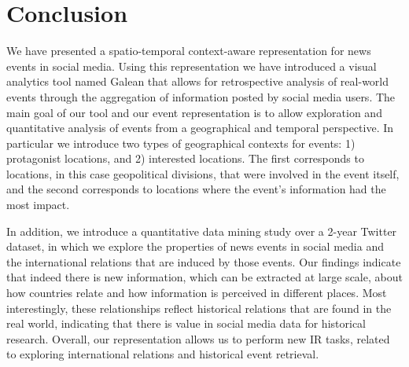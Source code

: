 
\section{Conclusion} \label{sec:conclusions}


We have presented a spatio-temporal context-aware representation for news events
in social media. 
%
Using this representation we have introduced a visual analytics tool named
Galean that allows for retrospective analysis of real-world events through the
aggregation of information posted by social media users. 
%
The main goal of our tool and our event representation is to allow exploration
and quantitative analysis of events from a geographical and temporal
perspective. 
%
In particular we introduce two types of geographical contexts for events: 1)
protagonist locations, and 2) interested locations. 
%
The first corresponds to locations, in this case geopolitical divisions, that
were involved in the event itself, and the second corresponds to locations where
the event's information had the most impact.


In addition, we introduce a quantitative data mining study over a 2-year Twitter
dataset, in which we explore the properties of news events in social media and
the international relations that are induced by those events.  
%
Our findings indicate that indeed there is new information, which can be
extracted at large scale, about how countries relate and how information is
perceived in different places. 
%
Most interestingly, these relationships reflect historical relations that are
found in the real world, indicating that there is value in social media data for
historical research.
%
Overall, our representation allows us to perform new IR tasks, related to
exploring international relations and historical event retrieval.
